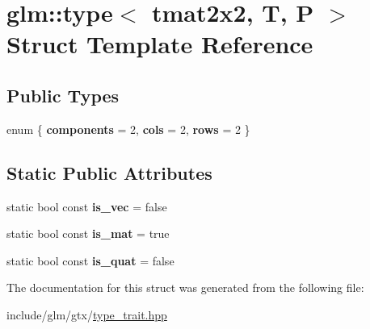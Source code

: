 \hypertarget{structglm_1_1type_3_01tmat2x2_00_01T_00_01P_01_4}{}\section{glm\+:\+:type$<$ tmat2x2, T, P $>$ Struct Template Reference}
\label{structglm_1_1type_3_01tmat2x2_00_01T_00_01P_01_4}
\subsection*{Public Types}
\begin{DoxyCompactItemize}
\item 
\mbox{\label{structglm_1_1type_3_01tmat2x2_00_01T_00_01P_01_4_a350f7d4c7867f93ed4404cd05718ddf4}} 
enum \{ {\bfseries components} = 2, 
{\bfseries cols} = 2, 
{\bfseries rows} = 2
 \}
\end{DoxyCompactItemize}
\subsection*{Static Public Attributes}
\begin{DoxyCompactItemize}
\item 
\mbox{\label{structglm_1_1type_3_01tmat2x2_00_01T_00_01P_01_4_a4ae662052764bbc11115ab73fac7b053}} 
static bool const {\bfseries is\+\_\+vec} = false
\item 
\mbox{\label{structglm_1_1type_3_01tmat2x2_00_01T_00_01P_01_4_ad4cab148bf9dfc3590df0d54c0b91841}} 
static bool const {\bfseries is\+\_\+mat} = true
\item 
\mbox{\label{structglm_1_1type_3_01tmat2x2_00_01T_00_01P_01_4_adc925aea1a0a8eb2b8b59c5a78329d4c}} 
static bool const {\bfseries is\+\_\+quat} = false
\end{DoxyCompactItemize}


The documentation for this struct was generated from the following file\+:\begin{DoxyCompactItemize}
\item 
include/glm/gtx/\hyperlink{type__trait_8hpp}{type\+\_\+trait.\+hpp}\end{DoxyCompactItemize}
